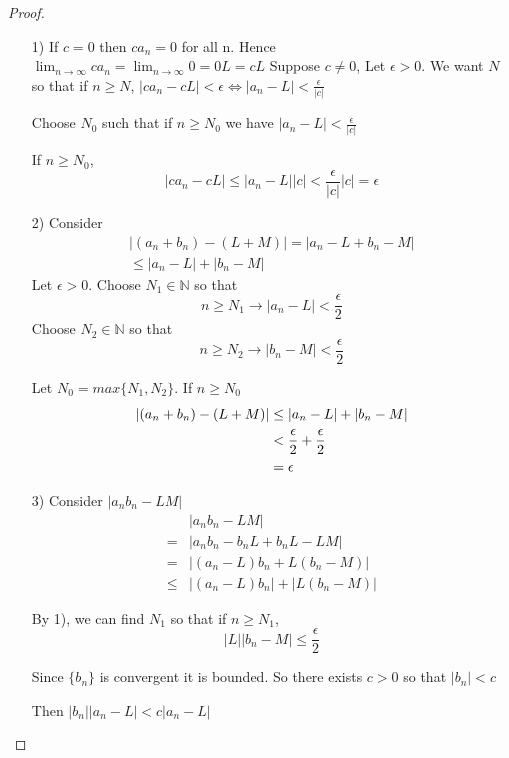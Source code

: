 \begin{proof}
\leavevmode
\begin{enumerate}
\item[1)] If $c=0$ then $ca_n = 0$ for all n. Hence $\lim_{n\to\infty} ca_n =\lim_{n\to\infty} 0 = 0L = cL$
Suppose $c\neq 0$, Let $\epsilon > 0$. We want $N$ so that if $n\geq N$, $\displaystyle |ca_n - cL| < \epsilon \Leftrightarrow |a_n-L|<\frac{\epsilon}{|c|}$

Choose $N_0$ such that if $n\geq N_0$ we have $\displaystyle |a_n-L|<\frac{\epsilon}{|c|}$

If $n\geq N_0$, $$|ca_n - cL|\leq |a_n - L||c|<\frac{\epsilon}{|c|}|c|=\epsilon$$

\item[2)] Consider
\begin{align*}
    \left| (a_n+b_n) - (L+M) \right| = \left| a_n-L + b_n-M \right|\\
    \leq \left| a_n - L \right| + \left| b_n - M\right| 
\end{align*}
Let $\epsilon > 0$. Choose $N_1 \in \mathbb{N}$ so that 
\[
n\geq N_1 \to \left| a_n - L \right| < \frac{\epsilon}{2}
\]
Choose $N_2 \in \mathbb{N}$ so that 
\[
n\geq N_2 \to \left| b_n - M \right| < \frac{\epsilon}{2}
\]

Let $N_0 = max \{N_1,N_2\}$. If $n\geq N_0 $
\begin{align*}
   \left| (a_n+b_n) - (L+M) \right| & \leq \left|  a_n-L \right|  + \left| b_n - M \right| \\
   & < \frac{\epsilon}{2} + \frac{\epsilon}{2} \\
   & =\epsilon
\end{align*}

\item[3)] Consider $\left| a_nb_n - LM \right|$
\begin{align*}
  &  \left| a_nb_n - LM \right|\\
    = &\left| a_nb_n - b_nL + b_nL - LM \right|\\
    = &\left| (a_n-L)b_n + L(b_n-M)\right|\\
    \leq & \left| (a_n-L)b_n \right| + \left| L(b_n-M) \right|
\end{align*}


By 1), we can find $N_1$ so that if $n\geq N_1$, \[\left| L  \right| \left| b_n - M \right| \leq \frac{\epsilon}{2} \]

Since $\{b_n\}$ is convergent it is bounded. So there exists $c>0$ so that $\left| b_n \right| < c $

Then $\left| b_n \right| \left| a_n-L \right| <c\left| a_n - L \right|  $


\end{enumerate}
\end{proof}
